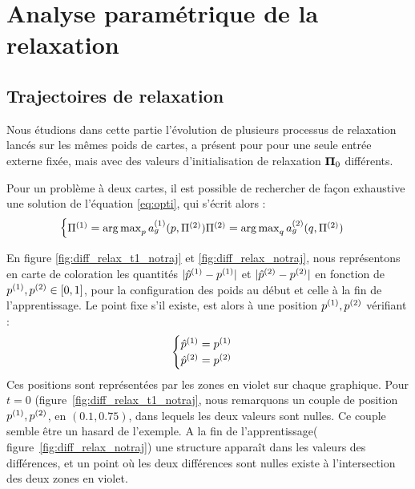 \documentclass[../main]{subfiles}
\begin{document}
\section{Analyse paramétrique de la relaxation}


\subsection{Trajectoires de relaxation\label{sec:pf}}

Nous étudions dans cette partie l'évolution de plusieurs processus de relaxation lancés sur les mêmes poids de cartes, a présent pour pour une seule entrée externe fixée, mais avec des valeurs d'initialisation de relaxation $\mathbf{\Pi}_0$ différents.

Pour un problème à deux cartes, il est possible de rechercher de façon exhaustive une solution de l'équation \ref{eq:opti}, qui s'écrit alors : 
\begin{equation}
	\begin{cases}
		\Pi^{({1})} = \operatorname*{arg\,max}_p a_g^{({1})}(p, \Pi^{({2})})
		\Pi^{({2})} = \operatorname*{arg\,max}_q a_g^{({2})}(q, \Pi^{({2})})
	\end{cases}
\end{equation}

En figure \ref{fig:diff_relax_t1_notraj} et \ref{fig:diff_relax_notraj}, nous représentons en carte de coloration les quantités $\lvert \hat{p}^{({1})} - p^{({1})} \rvert$ et $\lvert \hat{p}^{({2})} - p^{({2})}\rvert$ en fonction de $p^{({1})},p^{({2})} \in [0,1]$, pour la configuration des poids au début et celle à la fin de l'apprentissage.
Le point fixe s'il existe, est alors à une position $p^{({1})},p^{({2})}$ vérifiant :
\begin{equation*}
\begin{cases}
\hat{p}^{({1})} = p^{({1})}\\
\hat{p}^{({2})} = p^{({2})}\\
\end{cases}
\end{equation*}
Ces positions sont représentées par les zones en violet sur chaque graphique.
Pour $t = 0$ (figure~\ref{fig:diff_relax_t1_notraj}, nous remarquons un couple de position $p^{({1})}, p^{({2})}$, en $(0.1, 0.75)$, dans lequels les deux valeurs sont nulles. Ce couple semble être un hasard de l'exemple.
A la fin de l'apprentissage( figure~\ref{fig:diff_relax_notraj}) une structure apparaît dans les valeurs des différences, et un point où les deux différences sont nulles existe à l'intersection des deux zones en violet.
\end{document}
